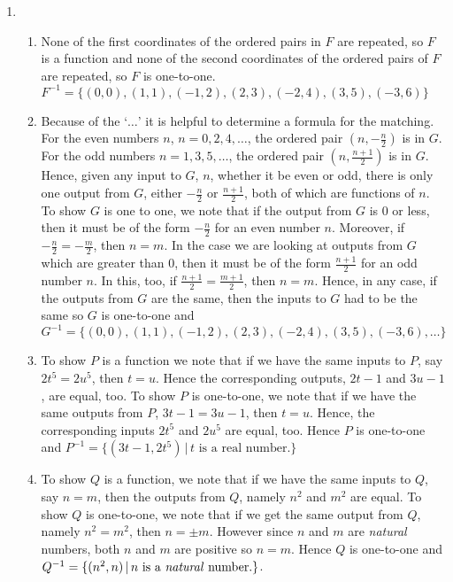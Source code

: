 \documentclass{ximera}
\begin{document}
\begin{enumerate}
\setcounter{enumi}{\value{HW}}

\item

\begin{enumerate}

\item  None of the first coordinates of the ordered pairs in $F$ are repeated, so $F$ is a function and none of the second coordinates of the ordered pairs of $F$ are repeated, so $F$ is one-to-one.   $F^{-1} = \{ (0,0), (1,1), (-1,2), (2,3), (-2,4), (3,5), (-3,6)  \}$

\item  Because of the `$\ldots$' it is helpful to determine a formula for the matching. For the even numbers $n$, $n = 0, 2, 4, \ldots$, the ordered pair $\left(n, -\frac{n}{2} \right)$ is in $G$.  For the odd numbers  $n = 1, 3, 5, \ldots$, the ordered pair $\left(n, \frac{n+1}{2} \right)$ is in $G$.  Hence, given any input to $G$, $n$, whether it be even or odd, there is only one output from $G$, either $-\frac{n}{2}$ or $\frac{n+1}{2}$, both of which are functions of $n$. To show $G$ is one to one, we note that if the output from $G$ is $0$ or less, then it must be of the form $-\frac{n}{2}$ for an even number $n$.  Moreover, if $-\frac{n}{2} = -\frac{m}{2}$, then $n = m$. In the case we are looking at outputs from $G$ which are greater than $0$, then it must be of the form $\frac{n+1}{2}$ for an odd number $n$.  In this, too, if  $\frac{n+1}{2} = \frac{m+1}{2}$, then $n = m$.  Hence, in any case, if the outputs from $G$ are the same, then the inputs to $G$ had to be the same so  $G$ is one-to-one and $G^{-1} = \{ (0,0), (1,1), (-1,2), (2,3), (-2,4), (3,5), (-3,6), \ldots \}$  


\item  To show $P$ is a function we note that if we have the same inputs to $P$, say $2t^{5} = 2u^{5}$, then $t = u$.  Hence the corresponding outputs, $2t-1$ and $3u-1$, are equal, too. To show $P$ is one-to-one, we note that if we have the same outputs from $P$, $3t-1 = 3u-1$, then $t = u$.  Hence, the corresponding  inputs $2t^5$  and $2u^5$ are equal, too. Hence $P$ is one-to-one and $P^{-1} = \{ (3t-1, 2t^5) \, | \, \text{$t$ is a real number.} \}$

\item  To show $Q$ is a function, we note that if we have the same inputs to $Q$, say $n = m$, then the outputs from $Q$, namely $n^2$ and $m^2$ are equal. To show $Q$ is one-to-one, we note that if we get the same output from $Q$, namely $n^2 = m^2$, then $n = \pm m$.  However since $n$ and $m$ are \textit{natural} numbers, both $n$ and $m$ are positive so $n = m$. Hence $Q$ is one-to-one and $Q^{-1} = \{ (n^2, n) \, | \, \text{$n$ is a \textit{natural} number.} \}$.

\end{enumerate}

\setcounter{HW}{\value{enumi}}
\end{enumerate}
\end{document}
